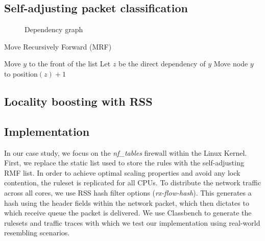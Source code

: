 \subsection{Self-adjusting packet classification}
\label{sec:sa-sa-pack-class}

\begin{figure}[t]
  \centering
  \begin{small}
  \end{small}
  \caption{Dependency graph}%
  \label{fig:class-dep}
\end{figure}

\begin{algorithm}
  \caption{Move Recursively Forward (MRF)}
  \label{alg:alg}
  \begin{small}
    \begin{algorithmic}[1]
      \State Move $y$ to the front of the list
      \Else
      \State Let $z$ be the direct dependency of $y$
      \State Move node $y$ to position$(z) + 1$
      \State {}
      \EndIf
      \EndProcedure
    \end{algorithmic}
  \end{small}
\end{algorithm}

\subsection{Locality boosting with RSS}
\label{sec:sa-rss}




\subsection{Implementation}
\label{sec:sa-nf-tables-impl}
In our case study, we focus on the \textit{nf\_tables} firewall within the Linux Kernel. First, we replace the static list used to store the rules with the self-adjusting RMF list. 
In order to achieve optimal scaling properties and avoid any lock contention, the ruleset is replicated for all CPUs. To distribute the network traffic across all cores, we use RSS hash filter options (\textit{rx-flow-hash}).
This generates a hash using the header fields within the network packet, which then dictates to which receive queue the packet is delivered.
We use Classbench \cite{4237157} to generate the rulesets and traffic traces with which we test our implementation using real-world resembling scenarios. 


